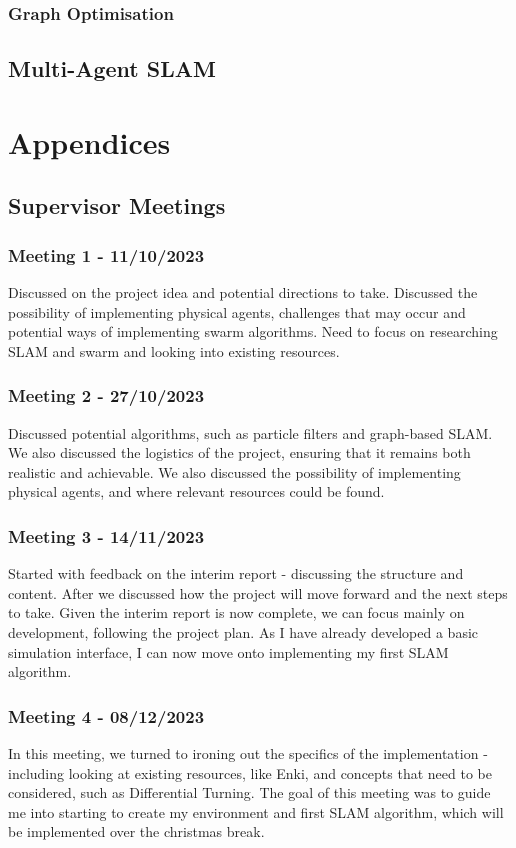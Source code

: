 \documentclass[12pt]{article}
\begin{document}
\subsubsection{Graph Optimisation}


\subsection{Multi-Agent SLAM}


\section{Appendices}
\subsection{Supervisor Meetings}
\subsubsection{Meeting 1 - 11/10/2023}
Discussed on the project idea and potential directions to take. Discussed the possibility of implementing physical agents,
challenges that may occur and potential ways of implementing swarm algorithms. Need to focus on researching SLAM and swarm
and looking into existing resources.
\subsubsection{Meeting 2 - 27/10/2023}
Discussed potential algorithms, such as particle filters and graph-based SLAM. We also discussed the logistics of the project,
ensuring that it remains both realistic and achievable. We also discussed the possibility of implementing physical agents,
and where relevant resources could be found.
\subsubsection{Meeting 3 - 14/11/2023}
Started with feedback on the interim report - discussing the structure and content. After we discussed how the project will
move forward and the next steps to take. Given the interim report is now complete, we can focus mainly on development, following
the project plan. As I have already developed a basic simulation interface, I can now move onto implementing my first SLAM algorithm.
\subsubsection{Meeting 4 - 08/12/2023}
In this meeting, we turned to ironing out the specifics of the implementation - including looking at existing resources, like
Enki, and concepts that need to be considered, such as Differential Turning. The goal of this meeting was to guide me into
starting to create my environment and first SLAM algorithm, which will be implemented over the christmas break.
\end{document}

